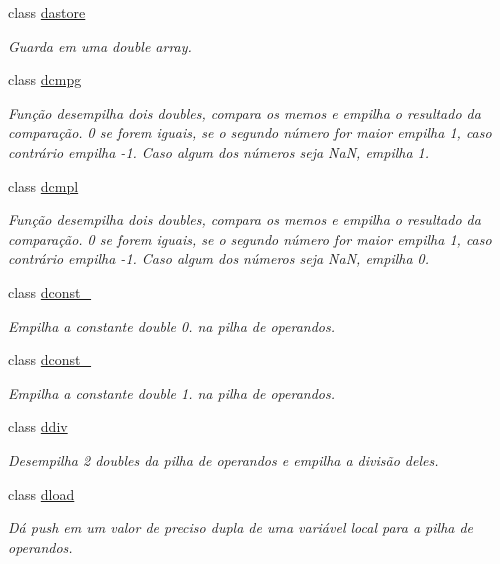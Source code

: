 \begin{DoxyCompactItemize}
class \hyperlink{class_instruction_impl_1_1dastore}{dastore}
\begin{DoxyCompactList}\small\item\em Guarda em uma double array. \end{DoxyCompactList}\item 
class \hyperlink{class_instruction_impl_1_1dcmpg}{dcmpg}
\begin{DoxyCompactList}\small\item\em Função desempilha dois doubles, compara os memos e empilha o resultado da comparação. 0 se forem iguais, se o segundo número for maior empilha 1, caso contrário empilha -\/1. Caso algum dos números seja NaN, empilha 1. \end{DoxyCompactList}\item 
class \hyperlink{class_instruction_impl_1_1dcmpl}{dcmpl}
\begin{DoxyCompactList}\small\item\em Função desempilha dois doubles, compara os memos e empilha o resultado da comparação. 0 se forem iguais, se o segundo número for maior empilha 1, caso contrário empilha -\/1. Caso algum dos números seja NaN, empilha 0. \end{DoxyCompactList}\item 
class \hyperlink{class_instruction_impl_1_1dconst__0}{dconst\+\_}
\begin{DoxyCompactList}\small\item\em Empilha a constante double 0. na pilha de operandos. \end{DoxyCompactList}\item 
class \hyperlink{class_instruction_impl_1_1dconst__1}{dconst\+\_}
\begin{DoxyCompactList}\small\item\em Empilha a constante double 1. na pilha de operandos. \end{DoxyCompactList}\item 
class \hyperlink{class_instruction_impl_1_1ddiv}{ddiv}
\begin{DoxyCompactList}\small\item\em Desempilha 2 doubles da pilha de operandos e empilha a divisão deles. \end{DoxyCompactList}\item 
class \hyperlink{class_instruction_impl_1_1dload}{dload}
\begin{DoxyCompactList}\small\item\em Dá push em um valor de preciso dupla de uma variável local para a pilha de operandos. \end{DoxyCompactList}\item 

\end{DoxyCompactItemize}
